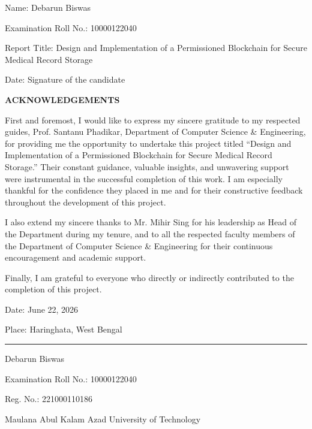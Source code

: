 \documentclass[12pt]{article}
\begin{document}
\vspace{1.5cm}

Name: Debarun Biswas

Examination Roll No.: 10000122040

Report Title: Design and Implementation of a Permissioned Blockchain for Secure Medical Record Storage

\vspace{2.5cm}

Date: \hspace{8.7cm} Signature of the candidate

\newpage
\setcounter{page}{5}

\begin{center}
\textbf{ACKNOWLEDGEMENTS}
\end{center}

\vspace{0.6cm}

First and foremost, I would like to express my sincere gratitude to my respected guides, Prof. Santanu Phadikar, Department of Computer Science \& Engineering, for providing me the opportunity to undertake this project titled “Design and Implementation of a Permissioned Blockchain for Secure Medical Record Storage.” Their constant guidance, valuable insights, and unwavering support were instrumental in the successful completion of this work. I am especially thankful for the confidence they placed in me and for their constructive feedback throughout the development of this project.

I also extend my sincere thanks to Mr. Mihir Sing for his leadership as Head of the Department during my tenure, and to all the respected faculty members of the Department of Computer Science \& Engineering for their continuous encouragement and academic support.

Finally, I am grateful to everyone who directly or indirectly contributed to the completion of this project.

\vspace{1.5cm}

Date: June 22, 2026

Place: Haringhata, West Bengal

\vspace{1cm}
\begin{flushright}
\rule{6cm}{0.4pt}

Debarun Biswas

Examination Roll No.: 10000122040

Reg. No.: 221000110186

Maulana Abul Kalam Azad University of Technology
\end{flushright}
\newpage
\end{document}
